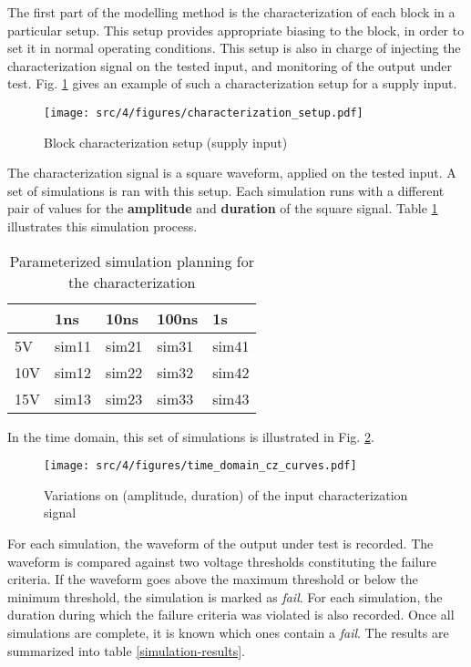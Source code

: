 The first part of the modelling method is the characterization of each block in a particular setup.
This setup provides appropriate biasing to the block, in order to set it in normal operating conditions.
This setup is also in charge of injecting the characterization signal on the tested input, and monitoring of the output under test.
Fig. \ref{block_function_cz} gives an example of such a characterization setup for a supply input.

\begin{figure}[!h]
  \centering
  \texttt{[image: src/4/figures/characterization\_setup.pdf]}
  \caption{Block characterization setup (supply input)}
  \label{block_function_cz}
\end{figure}

The characterization signal is a square waveform, applied on the tested input.
A set of simulations is ran with this setup.
Each simulation runs with a different pair of values for the \textbf{amplitude} and \textbf{duration} of the square signal.
Table \ref{parameterized-simulations} illustrates this simulation process.

\begin{table}[!h]
\centering
\begin{tabular}{@{}lllll@{}}
\toprule
    & 1ns   & 10ns  & 100ns & 1\textmugreek{}s   \\ \midrule
5V  & sim11 & sim21 & sim31 & sim41 \\
10V & sim12 & sim22 & sim32 & sim42 \\
15V & sim13 & sim23 & sim33 & sim43 \\ \bottomrule
\end{tabular}
\caption{Parameterized simulation planning for the characterization}
\label{parameterized-simulations}
\end{table}

In the time domain, this set of simulations is illustrated in Fig. \ref{set_input_signals}.

\begin{figure}[!h]
  \centering
  \texttt{[image: src/4/figures/time\_domain\_cz\_curves.pdf]}
  \caption{Variations on (amplitude, duration) of the input characterization signal}
  \label{set_input_signals}
\end{figure}

For each simulation, the waveform of the output under test is recorded.
The waveform is compared against two voltage thresholds constituting the failure criteria.
If the waveform goes above the maximum threshold or below the minimum threshold, the simulation is marked as \textit{fail}.
For each simulation, the duration during which the failure criteria was violated is also recorded.
Once all simulations are complete, it is known which ones contain a \textit{fail}.
The results are summarized into table \ref{simulation-results}.

